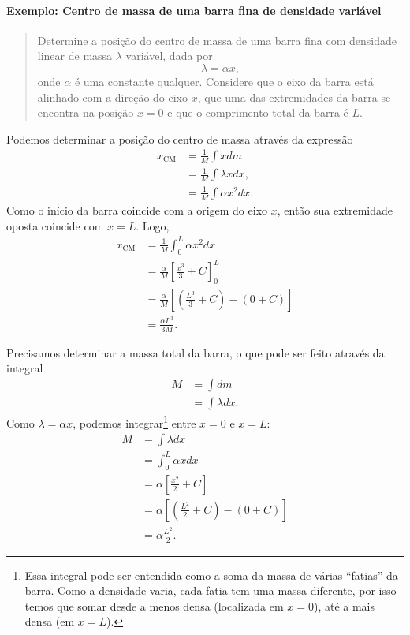 \paragraph{Exemplo: Centro de massa de uma barra fina de densidade variável}

\begin{quote}
    Determine a posição do centro de massa de uma barra fina com densidade linear de massa $\lambda$ variável, dada por
    \begin{equation}
        \lambda = \alpha x,
    \end{equation}
    onde $\alpha$ é uma constante qualquer. Considere que o eixo da barra está alinhado com a direção do eixo $x$, que uma das extremidades da barra se encontra na posição $x = 0$ e que o comprimento total da barra é $L$.
\end{quote}

Podemos determinar a posição do centro de massa através da expressão
\begin{align}
    x_{\text{CM}} &= \frac{1}{M} \int x dm \\
    &= \frac{1}{M} \int \lambda x dx, \\
    &= \frac{1}{M} \int \alpha x^2 dx.
\end{align}
%
Como o início da barra coincide com a origem do eixo $x$, então sua extremidade oposta coincide com $x = L$. Logo,
\begin{align}
    x_{\text{CM}} &= \frac{1}{M} \int_0^L \alpha x^2 dx \\
    &= \frac{\alpha}{M} \left[\frac{x^3}{3} + C\right]_0^L \\
    &= \frac{\alpha}{M} \left[\left(\frac{L^3}{3} + C\right) - (0 + C)\right] \\
    &= \frac{\alpha L^3}{3M}.
\end{align}

Precisamos determinar a massa total da barra, o que pode ser feito através da integral
\begin{align}
    M &= \int dm \\
    &= \int \lambda dx.
\end{align}
%
Como $\lambda = \alpha x$, podemos integrar\footnote{Essa integral pode ser entendida como a soma da massa de várias ``fatias'' da barra. Como a densidade varia, cada fatia tem uma massa diferente, por isso temos que somar desde a menos densa (localizada em $x = 0$), até a mais densa (em $x = L$).} entre $x = 0$ e $x = L$:
\begin{align}
    M &= \int \lambda dx \\
    &= \int_0^L \alpha x dx \\
    &= \alpha \left[\frac{x^2}{2} + C\right]\\
    &= \alpha \left[\left(\frac{L^2}{2} + C\right) - \left(0 + C\right)\right] \\
    &= \alpha \frac{L^2}{2}.
\end{align}

